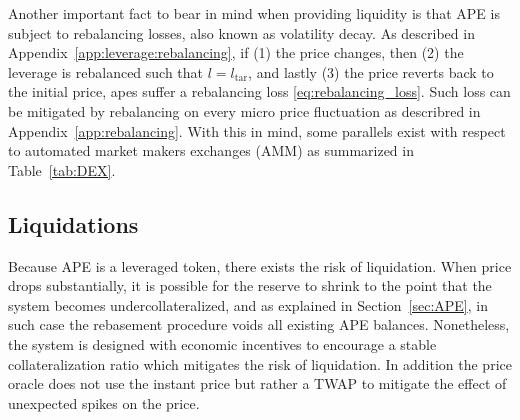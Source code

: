 \documentclass[journal,letterpaper,oneside,onecolumn,12pt]{IEEEtran}
\begin{document}
	Another important fact to bear in mind when providing liquidity is that APE is subject to rebalancing losses, also known as volatility decay. As described in Appendix~\ref{app:leverage:rebalancing}, if (1) the price changes, then (2) the leverage is rebalanced such that $l=l_\textrm{tar}$, and lastly (3) the price reverts back to the initial price, apes suffer a rebalancing loss \eqref{eq:rebalancing_loss}. Such loss can be mitigated by rebalancing on every micro price fluctuation as describred in Appendix~\ref{app:rebalancing}. With this in mind, some parallels exist with respect to automated market makers exchanges (AMM) as summarized in Table~\ref{tab:DEX}.
	\begin{table}
		\centering
		\caption{Parallelisms between AMM and SIR}
		\label{tab:DEX}
	\end{table}

	
	
	\subsection{Liquidations}
	
	Because APE is a leveraged token, there exists the risk of liquidation. When price drops substantially, it is possible for the reserve to shrink to the point that the system becomes undercollateralized, and as explained in Section~\ref{sec:APE}, in such case the rebasement procedure voids all existing APE balances. Nonetheless, the system is designed with economic incentives to encourage a stable collateralization ratio which mitigates the risk of liquidation. In addition the price oracle does not use the instant price but rather a TWAP to mitigate the effect of unexpected spikes on the price.
	
	

	
\end{document}
